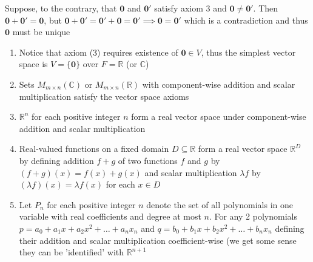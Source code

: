 \documentclass{report}
\begin{document}
\newpage

\begin{myproof}
Suppose, to the contrary, that $\mathbf{0}$ and $\mathbf{0'}$ satisfy axiom 3 and $\mathbf{0} \ne \mathbf{0'}$. Then $\mathbf{0+0'=0}$, but $\mathbf{0+0'=0'+0=0'} \implies \mathbf{0=0'}$ which is a contradiction and thus $\mathbf{0}$ must be unique
\end{myproof} 

 {
    \begin{enumerate}
        \item   Notice that axiom (3) requires existence of $\mathbf{0}\in V$, thus the simplest vector space is $V=\{ \mathbf{0}\}$ over $F=\mathbb{R}$ (or $\mathbb{C}$)
        \item Sets $M_{m \times n}(\mathbb{C})$ or $M_{m \times n} (\mathbb{R})$ with component-wise addition and scalar multiplication satisfy the vector space axioms
        \item $ \mathbb{R}^n$ for each positive integer $n$ form a real vector space under component-wise addition and scalar multiplication
        \item Real-valued functions on a fixed domain $D \subseteq \mathbb{R} $ form a real vector space $ \mathbb{R}^D$ by defining addition $ f+g$ of two functions  $f$ and  $g$ by  $(f+g)(x)=f(x)+g(x)$ and scalar multiplication  $ \lambda f$ by $( \lambda f)(x)= \lambda f(x)$ for each $x \in D$
        \item Let $P_n$ for each positive integer  $n$ denote the set of all polynomials in one variable with real coefficients and degree at most  $n$. For any 2 polynomials  $p=a_0 + a_1x + a_2x^2 + \ldots + a_nx_n$ and $q=b_0 + b_1x + b_2x^2 + \ldots + b_nx_n $ defining their addition and scalar multiplication coefficient-wise (we get some sense they can be 'identified' with $ \mathbb{R}^{n+1}$            
    \end{enumerate}
} 

\end{document}
